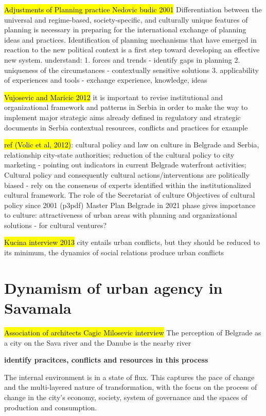 \documentclass[11pt]{report}
\begin{document}
\hl{Adjustments of Planning practice Nedovic budic 2001}
Differentiation between the universal and regime-based, society-speciﬁc, and culturally unique features of planning is necessary in preparing for the international exchange of planning ideas and practices. Identiﬁcation of planning mechanisms that have emerged in reaction to the new political context is a ﬁrst step toward developing an effective new system.
understand:
1. forces and trends - identify gaps in planning
2. uniqueness of the circumstances - contextually sensitive solutions
3. applicability of experiences and tools - exchange experience, knowledge, ideas

\hl{Vujosevic and Maricic 2012}
it is important to revise institutional and organizational framework and patterns in Serbia in order to make the way to implement major strategic aims already defined in regulatory and strategic documents in Serbia
contextual resources, conflicts and practices for example

\hl{ref (Volic et al, 2012)}:
cultural policy and law on culture in Belgrade and Serbia, relationship city-state authorities; reduction of the cultural policy to city marketing - pointing out indicators in current Belgrade waterfront activities;
Cultural policy and consequently cultural actions/interventions are  politically biased - rely on the consensus of experts identified within the institutionalized cultural framework.
The role of the Secretariat of culture
Objectives of cultural policy since 2001 (p3pdf) 
Master Plan Belgrade in 2021 phase gives importance to culture: attractiveness of urban areas with planning and organizational solutions - for cultural ventures?

\hl{Kucina interview 2013}
city entails urban conflicts, but they should be reduced to its minimum, the dynamics of social relations produce urban conflicts

\section{Dynamism of urban agency in Savamala}

\hl{Association of architects Cagic Milosevic interview}
The perception of Belgrade as a city on the Sava river and the Danube is the nearby river

\textbf{identify pracitces, conflicts and resources in this process}

The internal environment is in a state of flux. This captures the pace of change and the multi-layered nature of transformation, with the focus on the process of change in the city’s economy, society, system of governance and the spaces of production and consumption.
\end{document}
